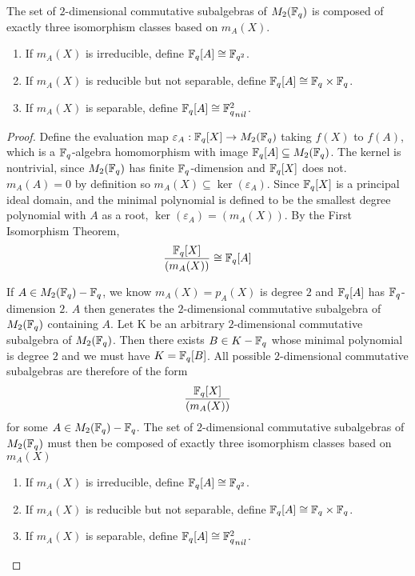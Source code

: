 \documentclass{amsart}
\begin{document}
    \begin{theorem}
        The set of $2$-dimensional commutative subalgebras of $M_2(\protect\mathbb{F}_q)$ is composed of exactly three isomorphism classes based on $m_A(X)$.
        \begin{enumerate}
            \item If $m_A(X)$ is irreducible, define $\protect\mathbb{F}_q[A] \cong \protect\mathbb{F}_{q^2}$.
            \item If $m_A(X)$ is reducible but not separable, define $\protect\mathbb{F}_q[A] \cong \protect\mathbb{F}_q \times \protect\mathbb{F}_q$.
            \item If $m_A(X)$ is separable, define $\bF_q[A] \cong {\bF_q^2}_{nil}$.
        \end{enumerate}
    \end{theorem}

    \begin{proof}
        Define the evaluation map $\varepsilon_A : \protect\mathbb{F}_q[X] \rightarrow M_2(\protect\mathbb{F}_q)$ taking $f(X)$ to $f(A)$, which is a $\protect\mathbb{F}_q$-algebra homomorphism with image $\protect\mathbb{F}_q[A] \subseteq M_2(\protect\mathbb{F}_q)$. The kernel is nontrivial, since $M_2(\protect\mathbb{F}_q)$ has finite $\protect\mathbb{F}_q$-dimension and $\protect\mathbb{F}_q[X]$ does not. $m_A(A) = 0$ by definition so $m_A(X) \subseteq \ker(\varepsilon_A)$. Since $\protect\mathbb{F}_q[X]$ is a principal ideal domain, and the minimal polynomial is defined to be the smallest degree polynomial with $A$ as a root, $\ker(\varepsilon_A) = (m_A(X))$. By the First Isomorphism Theorem,
        \begin{align*}
            \frac{\protect\mathbb{F}_q[X]}{(m_A(X))} \cong \protect\mathbb{F}_q[A]
        \end{align*}

        If $A \in M_2(\protect\mathbb{F}_q) - \protect\mathbb{F}_q$, we know $m_A(X) = p_A(X)$ is degree $2$ and $\protect\mathbb{F}_q[A]$ has $\protect\mathbb{F}_q$-dimension $2$. $A$ then generates the $2$-dimensional commutative subalgebra of $M_2(\protect\mathbb{F}_q)$ containing $A$. Let K be an arbitrary $2$-dimensional commutative subalgebra of $M_2(\protect\mathbb{F}_q)$. Then there exists $B \in K - \protect\mathbb{F}_q$ whose minimal polynomial is degree $2$ and we must have $K = \protect\mathbb{F}_q[B]$. All possible $2$-dimensional commutative subalgebras are therefore of the form
        \begin{align*}
            \frac{\protect\mathbb{F}_q[X]}{(m_A(X))}
        \end{align*}
        for some $A \in M_2(\protect\mathbb{F}_q) - \protect\mathbb{F}_q$. The set of $2$-dimensional commutative subalgebras of $M_2(\protect\mathbb{F}_q)$ must then be composed of exactly three isomorphism classes based on $m_A(X)$
        \begin{enumerate}
            \item If $m_A(X)$ is irreducible, define $\protect\mathbb{F}_q[A] \cong \protect\mathbb{F}_{q^2}$.
            \item If $m_A(X)$ is reducible but not separable, define $\protect\mathbb{F}_q[A] \cong \protect\mathbb{F}_q \times \protect\mathbb{F}_q$.
            \item If $m_A(X)$ is separable, define $\bF_q[A] \cong {\bF_q^2}_{nil}$.
        \end{enumerate}
    \end{proof}
\end{document}
